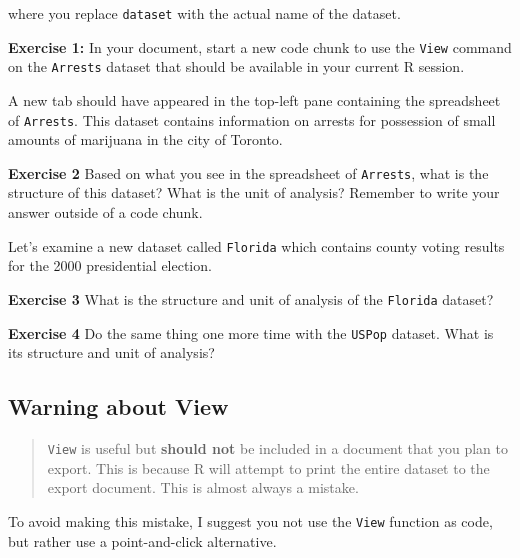 \documentclass[
]{book}
\newenvironment{rmdblock}[1]
  {\begin{shaded*}
  }
  {\end{shaded*}
  }
\newenvironment{learncheck}
  {\begin{rmdblock}{warning}}
  {\end{rmdblock}}
\begin{document}
where you replace \texttt{dataset} with the actual name of the dataset.

\begin{learncheck}
\textbf{Exercise 1:} In your document, start a new code chunk to use the
\texttt{View} command on the \texttt{Arrests} dataset that should be
available in your current R session.
\end{learncheck}

A new tab should have appeared in the top-left pane containing the spreadsheet of \texttt{Arrests}. This dataset contains information on arrests for possession of small amounts of marijuana in the city of Toronto.

\begin{learncheck}
\textbf{Exercise 2} Based on what you see in the spreadsheet of
\texttt{Arrests}, what is the structure of this dataset? What is the
unit of analysis? Remember to write your answer outside of a code chunk.
\end{learncheck}

Let's examine a new dataset called \texttt{Florida} which contains county voting results for the 2000 presidential election.

\begin{learncheck}
\textbf{Exercise 3} What is the structure and unit of analysis of the
\texttt{Florida} dataset?
\end{learncheck}

\begin{learncheck}
\textbf{Exercise 4} Do the same thing one more time with the
\texttt{USPop} dataset. What is its structure and unit of analysis?
\end{learncheck}

\hypertarget{warning-about-view}{%
\subsection{Warning about View}\label{warning-about-view}}

\begin{quote}
\texttt{View} is useful but \textbf{should not} be included in a document that you plan to export. This is because R will attempt to print the entire dataset to the export document. This is almost always a mistake.
\end{quote}

To avoid making this mistake, I suggest you not use the \texttt{View} function as code, but rather use a point-and-click alternative.
\end{document}
